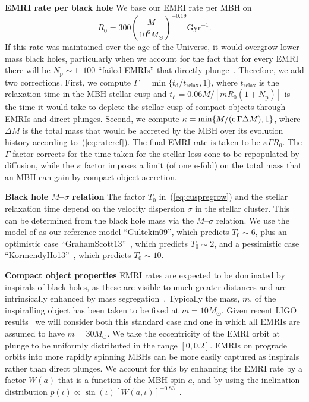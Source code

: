 \documentclass[a4paper]{jpconf}
\begin{document}
{\bf EMRI rate per black hole} We base our EMRI rate per MBH on~\cite{ASPreto11}
\begin{equation}
R_0 = 300 \left( \frac{M}{10^6M_\odot} \right)^{-0.19} \mathrm{Gyr}^{-1}.
\label{eq:rateref}
\end{equation}
If this rate was maintained over the age of the Universe, it would overgrow lower mass black holes, particularly when we account for the fact that for every EMRI there will be $N_\mathrm{p} \sim 1$--$100$ ``failed EMRIs'' that directly plunge~\cite{Merritt15}. Therefore, we add two corrections. First, we compute $\Gamma = \min\{t_\mathrm{d}/t_\mathrm{relax},1\}$, where $t_\mathrm{relax}$ is the relaxation time in the MBH stellar cusp and $t_\mathrm{d} = 0.06M/[m R_0 (1+N_\mathrm{p})]$ is the time it would take to deplete the stellar cusp of compact objects through EMRIs and direct plunges. Second, we compute $\kappa = \min\{M/({\rm e}\, \Gamma \Delta M),1\}$, where $\Delta M$ is the total mass that would be accreted by the MBH over its evolution history according to~(\ref{eq:rateref}). The final EMRI rate is taken to be $\kappa \Gamma R_0$. The $\Gamma$ factor corrects for the time taken for the stellar loss cone to be repopulated by diffusion, while the $\kappa$ factor imposes a limit (of one e-fold) on the total mass that an MBH can gain by compact object accretion.

{\bf Black hole $M$--$\sigma$ relation} The factor $T_0$ in~(\ref{eq:cuspregrow}) and the stellar relaxation time depend on the velocity dispersion $\sigma$ in the stellar cluster. This can be determined from the black hole mass via the $M$--$\sigma$ relation. We use the model of \cite{Gult09} as our reference model ``Gultekin09'', which predicts $T_0\sim 6$, plus an optimistic case ``GrahamScott13''~\cite{GrahamScott13}, which predicts $T_0 \sim 2$, and a pessimistic case ``KormendyHo13''~\cite{KormendyHo13}, which predicts $T_0 \sim 10$.

{\bf Compact object properties} EMRI rates are expected to be dominated by inspirals of black holes, as these are visible to much greater distances and are intrinsically enhanced by mass segregation~\cite{EMRIReview,JG09}. Typically the mass, $m$, of the inspiralling object has been taken to be fixed at $m=10M_\odot$. Given recent LIGO results~\cite{GW150914,O1Summary} we will consider both this standard case and one in which all EMRIs are assumed to have $m=30M_\odot$. We take the eccentricity of the EMRI orbit at plunge to be uniformly distributed in the range $[0,0.2]$. EMRIs on prograde orbits into more rapidly spinning MBHs can be more easily captured as inspirals rather than direct plunges. We account for this by enhancing the EMRI rate by a factor $W(a)$ that is a function of the MBH spin $a$, and by using the inclination distribution $p(\iota)\propto \sin(\iota) [W(a,\iota)]^{-0.83}$~\cite{ASSF13}.
\end{document}
